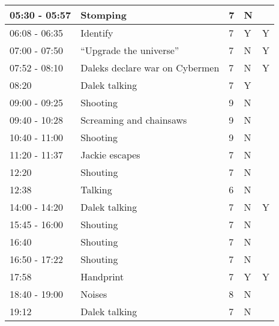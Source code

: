 \begin{longtable}{| p{70pt} | p{130pt} | p{45pt} | p{57pt} | p{60pt}|}
05:30 - 05:57           &          Stomping           &          7           &          N&\\\hline       
06:08 - 06:35           &          Identify           &          7           &          Y&Y\\\hline       
07:00 - 07:50           &          ``Upgrade the universe''           &          7           &          N&Y\\\hline       
07:52 - 08:10           &          Daleks declare war on Cybermen           &          7           &          N&Y\\\hline       
08:20           &          Dalek talking           &          7           &          Y&\\\hline       
09:00 - 09:25           &          Shooting           &          9           &          N&\\\hline       
09:40 - 10:28           &          Screaming and chainsaws           &          9           &          N&\\\hline       
10:40 - 11:00           &          Shooting           &          9           &          N&\\\hline       
11:20 - 11:37           &          Jackie escapes           &          7           &          N&\\\hline       
12:20           &          Shouting           &          7           &          N&\\\hline       
12:38           &          Talking           &          6           &          N&\\\hline       
14:00 - 14:20           &          Dalek talking           &          7           &          N&Y\\\hline       
15:45 - 16:00           &          Shouting           &          7           &          N&\\\hline       
16:40           &          Shouting           &          7           &          N&\\\hline       
16:50 - 17:22           &          Shouting           &          7           &          N&\\\hline       
17:58           &          Handprint           &          7           &          Y&Y\\\hline       
18:40 - 19:00           &          Noises           &          8           &          N&\\\hline       
19:12           &          Dalek talking           &          7           &          N&\\\hline       

\end{longtable}
